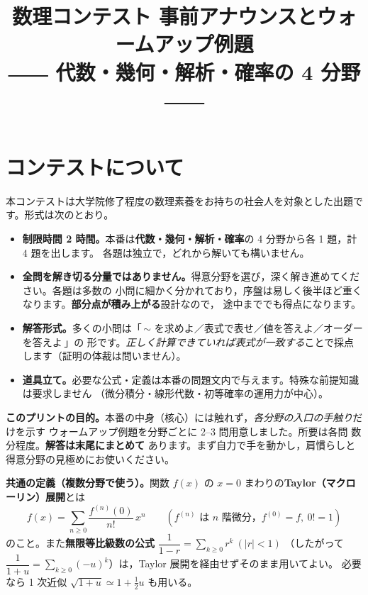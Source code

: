 \documentclass[dvipdfmx, uplatex]{jsarticle}
\title{数理コンテスト 事前アナウンスとウォームアップ例題\\
\large ―― 代数・幾何・解析・確率の 4 分野 ――}
\author{}
\date{}
\theoremstyle{definition}
\begin{document}
\maketitle
\vspace{-4zh}

\section*{コンテストについて}
本コンテストは大学院修了程度の数理素養をお持ちの社会人を対象とした出題です。形式は次のとおり。

\begin{itemize}[leftmargin=1.6em]
\item \textbf{制限時間 2 時間。}本番は\textbf{代数・幾何・解析・確率}の 4 分野から各 1 題，計 4 題を出します。
各題は独立で，どれから解いても構いません。
\item \textbf{全問を解き切る分量ではありません。}得意分野を選び，深く解き進めてください。各題は多数の
小問に細かく分かれており，序盤は易しく後半ほど重くなります。\textbf{部分点が積み上がる}設計なので，
途中まででも得点になります。
\item \textbf{解答形式。}多くの小問は「\,$\sim$ を求めよ／表式で表せ／値を答えよ／オーダーを答えよ\,」の
形です。\emph{正しく計算できていれば表式が一致する}ことで採点します（証明の体裁は問いません）。
\item \textbf{道具立て。}必要な公式・定義は本番の問題文内で与えます。特殊な前提知識は要求しません
（微分積分・線形代数・初等確率の運用力が中心）。
\end{itemize}

\medskip
\noindent\textbf{このプリントの目的。}本番の中身（核心）には触れず，\emph{各分野の入口の手触り}だけを示す
ウォームアップ例題を分野ごとに 2--3 問用意しました。所要は各問 数分程度。\textbf{解答は末尾にまとめて}
あります。まず自力で手を動かし，肩慣らしと得意分野の見極めにお使いください。

\medskip
\noindent\textbf{共通の定義（複数分野で使う）。}関数 $f(x)$ の $x=0$ まわりの\textbf{Taylor（マクローリン）展開}とは
\[
    f(x)=\sum_{n\ge0}\frac{f^{(n)}(0)}{n!}\,x^n
    \qquad(f^{(n)}\text{ は }n\text{ 階微分，}f^{(0)}=f,\ 0!=1)
\]
のこと。また\textbf{無限等比級数の公式} $\dfrac{1}{1-r}=\displaystyle\sum_{k\ge0}r^k\ (|r|<1)$
（したがって $\dfrac{1}{1+u}=\sum_{k\ge0}(-u)^k$）は，Taylor 展開を経由せずそのまま用いてよい。
必要なら 1 次近似 $\sqrt{1+u}\simeq1+\tfrac12u$ も用いる。
\end{document}
